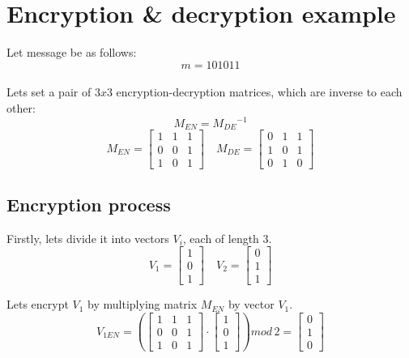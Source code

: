 \documentclass{article}
\begin{document}
\newpage
\section{Encryption \& decryption example}
    Let message be as follows: $$m = 101011$$\\
    \indent Lets set a pair of $3x3$ encryption-decryption matrices, which are inverse to each other:
    $$M_{EN} = {M_{DE}}^{-1}$$
    \vspace{1mm}
    $$M_{EN}=\begin{bmatrix}
    1 & 1 & 1 \\
    0 & 0 & 1 \\
    1 & 0 & 1
    \end{bmatrix} \quad
    M_{DE}=\begin{bmatrix}
    0 & 1 & 1 \\
    1 & 0 & 1 \\
    0 & 1 & 0
    \end{bmatrix}$$ \vspace{2mm}
    
    \subsection{Encryption process}
        Firstly, lets divide it into vectors $V_i$, each of length $3$.
        \vspace{1mm}
        $$V_1=\begin{bmatrix}
        1  \\
        0  \\
        1  
        \end{bmatrix} \quad
        V_2=\begin{bmatrix}
        0  \\
        1  \\
        1  
        \end{bmatrix}$$
    
        Lets encrypt $V_1$ by multiplying matrix $M_{EN}$ by vector $V_1$.
        $$
        V_{1EN}=
        \left(
        \begin{bmatrix}
        1 & 1 & 1 \\
        0 & 0 & 1 \\
        1 & 0 & 1
        \end{bmatrix} \cdot
        \begin{bmatrix}
        1  \\
        0  \\
        1  
        \end{bmatrix}
        \right)
        mod \, 2
        =
        \begin{bmatrix}
        0  \\
        1  \\
        0  
        \end{bmatrix}
        $$
        
\end{document}

